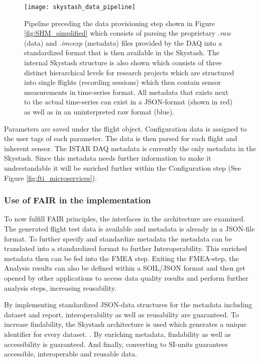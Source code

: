 \begin{figure}
    \centering
    \texttt{[image: skystash\_data\_pipeline]}
    \caption[FTI-Microservices: Data Provision]{Pipeline preceding the data provisioning step shown in Figure \ref{fig:SHM_simplified} which consists of parsing the proprietary \textit{.raw} (data) and \textit{.imcexp} (metadata) files provided by the DAQ into a standardized format that is then available in the Skystash. The internal Skystash structure is also shown which consists of three distinct hierarchical levels for research projects which are structured into single flights (recording sessions) which then contain sensor measurements in time-series format. All metadata that exists next to the actual time-series can exist in a JSON-format (shown in red) as well as in an uninterpreted raw format (blue).}
    \label{fig:skystash_data_pipeline}
\end{figure}

Parameters are saved under the flight object. Configuration data is assigned to the user tags of each parameter. The data is then parsed for each flight and inherent sensor. The ISTAR DAQ metadata is currently the only metadata in the Skystash. Since this metadata needs further information to make it understandable it will be enriched further within the Configuration step (See Figure \ref{fig:fti_microservices}).

\subsubsection{Use of FAIR in the implementation}
To now fulfill FAIR principles, the interfaces in the architecture are examined. The generated flight test data is available and metadata is already in a JSON-file format. To further specify and standardize metadata the metadata can be translated into a standardized format to further Interoperability. This enriched metadata then can be fed into the FMEA step. Exiting the FMEA-step, the Analysis results can also be defined within a SOIL/JSON format and then get opened by other applications to access data quality results and perform further analysis steps, increasing reusability.


By implementing standardized JSON-data structures for the metadata including dataset and report, interoperability as well as reusability are guaranteed. To increase findability, the Skystash architecture is used which generates a unique identifier for every dataset. \cite{meyer_development_2020}. By enriching metadata, findability as well as accessibility is guaranteed. And finally, converting to SI-units guarantees accessible, interoperable and reusable data.


